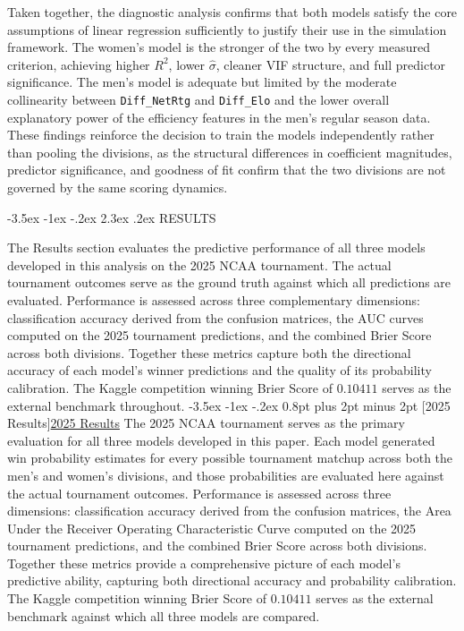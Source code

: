 \documentclass[12pt,leqno]{article}\usepackage[pdftex]{graphicx}\usepackage[dvipsnames]{xcolor}
\makeatletter
\renewcommand\section{\@startsection {section}{1}{\z@}%
{-3.5ex \@plus -1ex \@minus -.2ex}%
{2.3ex \@plus.2ex}%
{\normalfont\centering}}
\renewcommand\subsection{\@startsection {subsection}{1}{\z@}%
{-3.5ex \@plus -1ex \@minus -.2ex}%
{0.8pt plus 2pt minus 2pt}%
{\normalfont}}
\newcommand{\usubsection}[1]{\subsection[#1]{\centering\normalfont\underline{#1}}}%
\theoremstyle{remark}
\makeatother
\begin{document}
Taken together, the diagnostic analysis confirms that both models satisfy the core assumptions of linear regression sufficiently to justify their use in the simulation framework. The women's model is the stronger of the two by every measured criterion, achieving higher $R^2$, lower $\hat{\sigma}$, cleaner VIF structure, and full predictor significance. The men's model is adequate but limited by the moderate collinearity between \texttt{Diff\_NetRtg} and \texttt{Diff\_Elo} and the lower overall explanatory power of the efficiency features in the men's regular season data. These findings reinforce the decision to train the models independently rather than pooling the divisions, as the structural differences in coefficient magnitudes, predictor significance, and goodness of fit confirm that the two divisions are not governed by the same scoring dynamics.

\newpage

\begin{center}
\section{RESULTS}
\end{center}
\thispagestyle{empty} %
The Results section evaluates the predictive performance of all three models developed in this analysis on the 2025 NCAA tournament. The actual tournament outcomes serve as the ground truth against which all predictions are evaluated. Performance is assessed across three complementary dimensions: classification accuracy derived from the confusion matrices, the AUC curves computed on the 2025 tournament predictions, and the combined Brier Score across both divisions. Together these metrics capture both the directional accuracy of each model's winner predictions and the quality of its probability calibration. The Kaggle competition winning Brier Score of $0.10411$ serves as the external benchmark throughout.
\usubsection{2025 Results}
The 2025 NCAA tournament serves as the primary evaluation for all three models developed in this paper. Each model generated win probability estimates for every possible tournament matchup across both the men's and women's divisions, and those probabilities are evaluated here against the actual tournament outcomes. Performance is assessed across three dimensions: classification accuracy derived from the confusion matrices, the Area Under the Receiver Operating Characteristic Curve computed on the 2025 tournament predictions, and the combined Brier Score across both divisions. Together these metrics provide a comprehensive picture of each model's predictive ability, capturing both directional accuracy and probability calibration. The Kaggle competition winning Brier Score of $0.10411$ serves as the external benchmark against which all three models are compared.
\end{document}
